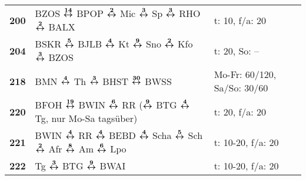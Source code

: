 \begin{minipage}[t]{0.45\textwidth}
\begin{tabular}{>{\bfseries}L{1.2cm}L{9.0cm}L{3.0cm}}
\bus{} 200    & BZOS $\xarwe{14}$ BPOP $\xarwe{2}$ Mic $\xarwe{3}$ Sp $\xarwe{3}$ RHO $\xarwe{2}$ BALX                                                                              & t: 10, f/a: 20             \\
\bus{} 204    & BSKR $\xarwe{5}$ BJLB $\xarwe{4}$ Kt $\xarwe{9}$ Sno $\xarwe{2}$ Kfo $\xarwe{3}$ BZOS                                                                               & t: 20, So: --              \\
\bus{} 218    & BMN $\xarwe{4}$ Th $\xarwe{3}$ BHST $\xarwe{30}$ BWSS                                                                                                               & Mo-Fr: 60/120, Sa/So: 30/60\\
\bus{} 220    & BFOH $\xarwe{19}$ BWIN $\xarwe{6}$ RR ($\xarwe{9}$ BTG $\xarwe{4}$ Tg, nur Mo-Sa tagsüber)                                                                          & t: 20, f/a: 20             \\
\bus{} 221    & BWIN $\xarwe{4}$ RR $\xarwe{4}$ BEBD $\xarwe{4}$ Scha $\xarwe{5}$ Sch $\xarwe{2}$ Afr $\xarwe{8}$ Am $\xarwe{6}$ Lpo                                                & t: 10-20, f/a: 20          \\
\bus{} 222    & Tg $\xarwe{3}$ BTG $\xarwe{9}$ BWAI                                                                                                                                 & t: 10-20, f/a: 20          \\
\hline
\end{tabular}
\end{minipage}
